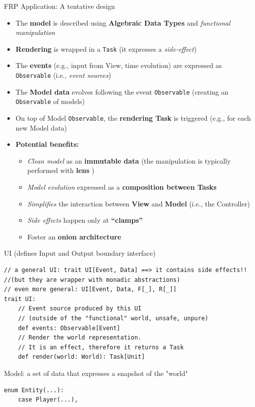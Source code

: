 \documentclass[presentation, 9pt]{beamer}\mode<presentation>{\usetheme{AMSBolognaFC}}
\begin{document}
\begin{frame}{FRP Application: A tentative design \href{https://github.com/cric96/scala-frp-gui}{\faLink}}
	\begin{itemize}
		\item The \textbf{model} is described using \textbf{Algebraic Data Types} and \emph{functional manipulation}
		\item \textbf{Rendering} is wrapped in a \texttt{Task} (it expresses a \emph{side-effect})
		\item The \textbf{events} (e.g., input from View, time evolution) are expressed as \texttt{Observable} (i.e., \emph{event sources})
		\item The \textbf{Model data} evolves following the event \texttt{Observable} (creating an \texttt{Observable} of models)
		\item On top of Model \texttt{Observable}, the \textbf{rendering Task} is triggered (e.g., for each new Model data)
		\item \textbf{Potential benefits:}
		\begin{itemize}
			\item \emph{Clean model} as an \textbf{immutable data} (the manipulation is typically performed with \textbf{lens} \href{https://www.optics.dev/Monocle/}{\faLink})
			\item \emph{Model evolution} expressed as a \textbf{composition between Tasks}
			\item \emph{Simplifies} the interaction between \textbf{View} and \textbf{Model} (i.e., the Controller)
			\item \emph{Side effects} happen only at \textbf{``clamps''}
			\item Foster an \textbf{onion architecture}
		\end{itemize}
	\end{itemize}
	\begin{alertblock}{UI (defines Input and Output boundary interface)}
	\begin{tcolorbox}[left=0pt, top=0pt, bottom=0pt]
		\begin{verbatim}
// a general UI: trait UI[Event, Data] ==> it contains side effects!! 
//(but they are wrapper with monadic abstractions)
// even more general: UI[Event, Data, F[_], R[_]]
trait UI:
	// Event source produced by this UI 
	// (outside of the "functional" world, unsafe, unpure)
	def events: Observable[Event]
	// Render the world representation. 
	// It is an effect, therefore it returns a Task
	def render(world: World): Task[Unit]
		\end{verbatim}
		\end{tcolorbox}
	\end{alertblock}
	\begin{alertblock}{Model: a set of data that expresses a snapshot of the "world"}
		\begin{tcolorbox}[left=0pt, top=0pt, bottom=0pt]
			\begin{verbatim}
enum Entity(...):
	case Player(...),


\end{verbatim}
\end{tcolorbox}
\end{alertblock}
\end{frame}
\end{document}
